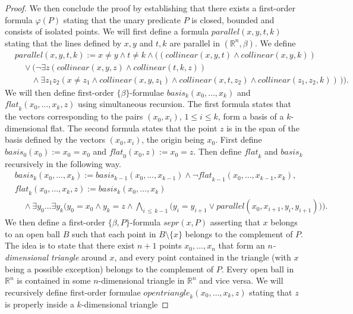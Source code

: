 \documentclass{LMCS}
\theoremstyle{plain}
\newcommand{\rp}{(\mathbb{R}^n,\beta)}
\newcommand{\rsq}{\mathbb{R}^n}
\newcommand{\mi}{\mathit}
\begin{document}
\begin{proof}
%
We then conclude the proof by establishing that there exists a first-order formula $\varphi(P)$
%
stating that the unary predicate $P$ is closed, bounded and consists of isolated points. We will first define a formula $\mi{parallel}(x,y,t,k)$ stating that the
%
lines defined by $x,y$ and $t,k$ are parallel in $\rp$. We define
%
\begin{align*}
&\mi{parallel}(x,y,t,k):= x\neq y\wedge t\neq k \wedge \Big((\mi{collinear}(x,y,t)\wedge \mi{collinear}(x,y,k))\\
&\quad\vee \big(\neg\exists z(\mi{collinear}(x,y,z)\wedge\mi{collinear}(t,k,z))\\
&\quad\quad\wedge \exists z_1 z_2(x\neq z_1\wedge\mi{collinear}(x,y,z_1)\wedge\mi{collinear}(x,t,z_2)\wedge\mi{collinear}(z_1,z_2,k))\, \big)\Big).
\end{align*}
%
We will then define first-order $\{\beta\}$-formulae $\mi{basis}_k(x_0,\dots,x_k)$ and $\mi{flat}_k(x_0,\dots,x_k,z)$ using simultaneous recursion.
%
The first formula states that the vectors corresponding to the pairs $(x_0,x_i)$, $1\leq i\leq k$, form a basis of a $k$-dimensional flat.
%
The second formula states that the point $z$ is in the span of the basis defined by the vectors $(x_0,x_i)$, the origin being $x_0$.
%
First define
%
$\mi{basis}_0(x_0):= x_0=x_0$ and
%
$\mi{flat}_0(x_0,z):= x_0=z$.
%
Then define $\mi{flat}_k$ and $\mi{basis_k}$ recursively in the following way.
%
\begin{align*}
%
&\mi{basis}_k(x_0,\dots,x_k):=\mi{basis}_{k-1}(x_0,\dots,x_{k-1})\wedge \neg \mi{flat}_{k-1}(x_0,\dots,x_{k-1},x_k),\\
%
&\mi{flat}_k(x_0,\dots,x_k,z):=\mi{basis}_k(x_0,\dots,x_k)\\
&\quad\wedge \exists y_0\dots \exists y_k\Big(y_0=x_0 \wedge y_k=z
\wedge\bigwedge_{i\, \leq\, k-1} \big(y_i=y_{i+1}\vee\mi{parallel}(x_0,x_{i+1},y_i,y_{i+1})\big)\Big).
\end{align*}
%
We then define a first-order $\{\beta,P\}$-formula $\mathit{sepr}(x,P)$ 
%
asserting that $x$ belongs to an open ball $B$ such that each point in $B\setminus\{x\}$
%
belongs to the complement of $P$.
%
The idea is to state that there exist $n+1$ points $x_0,\dots,x_n$
%
that form an \emph{$n$-dimensional triangle} around $x$, and every point contained in the triangle (with $x$ being a
%
possible exception) belongs to the complement of $P$. Every open ball in $\rsq$ is contained in some $n$-dimensional triangle in $\rsq$ and vice versa. We
%
will recursively define first-order formulae $\mi{opentriangle}_k(x_0,\dots,x_k,z)$ stating that $z$ is properly inside a $k$-dimensional triangle

\end{proof}
\end{document}
